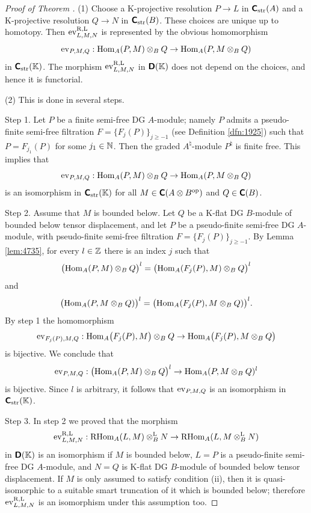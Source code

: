 \begin{proof}[Proof of Theorem \tup{\ref{thm:4320}}] \mbox{} 

\smallskip \noindent
(1) Choose a K-projective resolution 
$P \to L$ in $\boldsymbol{\mathsf{C}}_{\mathrm{str}}(A)$ and a K-projective resolution 
$Q \to N$ in $\boldsymbol{\mathsf{C}}_{\mathrm{str}}(B)$. These choices are unique up to 
homotopy. Then 
$\operatorname{ev}^{\mathrm{R, L}}_{L, M, N}$ 
is represented by the obvious homomorphism 
\[ \operatorname{ev}_{P, M, Q} : \operatorname{Hom}_{A}(P, M) \otimes_{B} Q \to 
\operatorname{Hom}_{A}(P, M \otimes_{B} Q) \]
in $\boldsymbol{\mathsf{C}}_{\mathrm{str}}(\mathbb{K})$. 
The morphism $\operatorname{ev}^{\mathrm{R, L}}_{L, M, N}$ in $\boldsymbol{\mathsf{D}}(\mathbb{K})$ does not 
depend on the choices, and hence it is functorial. 

\medskip \noindent 
(2) This is done in several steps. 

\smallskip \noindent 
Step 1. Let $P$ be a finite semi-free DG $A$-module; namely $P$ admits a 
pseudo-finite semi-free filtration $F = \{ F_j(P) \}_{j \geq -1}$
(see Definition \ref{dfn:1925}) such that $P = F_{j_1}(P)$ for some 
$j_1 \in \mathbb{N}$. Then the graded $A^{\natural}$-module $P^{\natural}$ is finite 
free. This implies that 
\[ \operatorname{ev}_{P, M, Q} : \operatorname{Hom}_{A}(P, M) \otimes_{B} Q \to 
\operatorname{Hom}_{A}(P, M \otimes_{B} Q) \]
is an isomorphism in $\boldsymbol{\mathsf{C}}_{\mathrm{str}}(\mathbb{K})$ for all 
$M \in \boldsymbol{\mathsf{C}}(A \otimes B^{\mathrm{op}})$ and $Q \in \boldsymbol{\mathsf{C}}(B)$. 

\medskip \noindent 
Step 2. Assume that $M$ is bounded below. 
Let $Q$ be a K-flat DG $B$-module of bounded below tensor displacement, and let 
$P$ be a pseudo-finite semi-free DG $A$-module, with pseudo-finite semi-free 
filtration $F = \{ F_j(P) \}_{j \geq -1}$.
By Lemma \ref{lem:4735}, for every $l \in \mathbb{Z}$ there is an index $j$ such that  
\[ \bigl( \operatorname{Hom}_{A}(P, M) \otimes_{B} Q \bigr)^l =
\bigl( \operatorname{Hom}_{A}(F_{j}(P), M) \otimes_{B} Q \bigr)^l \]
and 
\[ \bigl( \operatorname{Hom}_{A}(P, M \otimes_{B} Q) \bigr)^l  =
\bigl( \operatorname{Hom}_{A}(F_{j}(P), M \otimes_{B} Q) \bigr)^l . \]
By step 1 the homomorphism 
\[ \operatorname{ev}_{F_{j}(P), M, Q} : 
\operatorname{Hom}_{A} \bigl( F_{j}(P), M \bigr) \otimes_{B} Q \to 
\operatorname{Hom}_{A} \bigl( F_{j}(P), M \otimes_{B} Q \bigr) \]
is bijective. We conclude that 
\[ \operatorname{ev}_{P, M, Q} : \bigl( \operatorname{Hom}_{A}(P, M) \otimes_{B} Q \bigr)^l \to 
\operatorname{Hom}_{A}(P, M \otimes_{B} Q)^l \]
is bijective. Since $l$ is arbitrary, it follows that 
$\operatorname{ev}_{P, M, Q}$ is an isomorphism in $\boldsymbol{\mathsf{C}}_{\mathrm{str}}(\mathbb{K})$.

\medskip \noindent 
Step 3. In step 2 we proved that the morphism 
\[ \operatorname{ev}^{\mathrm{R, L}}_{L, M, N} : \operatorname{RHom}_{A}(L, M) \otimes^{\mathrm{L}}_{B} N 
\to \operatorname{RHom}_{A}(L, M \otimes^{\mathrm{L}}_{B} N) \]
in $\boldsymbol{\mathsf{D}}(\mathbb{K})$ is an isomorphism if $M$ is bounded below, 
$L = P$ is a pseudo-finite semi-free DG 
$A$-module, and $N = Q$ is K-flat DG $B$-module of bounded below tensor 
displacement. If $M$ is only assumed to satisfy condition (ii), then it is 
quasi-isomorphic to a suitable smart truncation of it which is bounded below; 
therefore $\operatorname{ev}^{\mathrm{R, L}}_{L, M, N}$ is an isomorphism under this 
assumption too. 


\end{proof}
